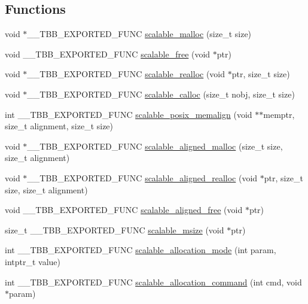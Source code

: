 \subsection*{Functions}
\begin{DoxyCompactItemize}
\item 
void $\ast$\+\_\+\+\_\+\+T\+B\+B\+\_\+\+E\+X\+P\+O\+R\+T\+E\+D\+\_\+\+F\+U\+N\+C \hyperlink{group__memory__allocation_ga2a5bdc71439a70b20f2eadf6e1a489e1}{scalable\+\_\+malloc} (size\+\_\+t size)
\item 
void \+\_\+\+\_\+\+T\+B\+B\+\_\+\+E\+X\+P\+O\+R\+T\+E\+D\+\_\+\+F\+U\+N\+C \hyperlink{group__memory__allocation_ga2ad3952b8c4dd7d293e02ae18fc37b84}{scalable\+\_\+free} (void $\ast$ptr)
\item 
void $\ast$\+\_\+\+\_\+\+T\+B\+B\+\_\+\+E\+X\+P\+O\+R\+T\+E\+D\+\_\+\+F\+U\+N\+C \hyperlink{group__memory__allocation_ga40d6e0bc19cdfa3005b2b935c62077a1}{scalable\+\_\+realloc} (void $\ast$ptr, size\+\_\+t size)
\item 
void $\ast$\+\_\+\+\_\+\+T\+B\+B\+\_\+\+E\+X\+P\+O\+R\+T\+E\+D\+\_\+\+F\+U\+N\+C \hyperlink{group__memory__allocation_ga3b4ff39555cd9e929fce2958325cd8ea}{scalable\+\_\+calloc} (size\+\_\+t nobj, size\+\_\+t size)
\item 
int \+\_\+\+\_\+\+T\+B\+B\+\_\+\+E\+X\+P\+O\+R\+T\+E\+D\+\_\+\+F\+U\+N\+C \hyperlink{group__memory__allocation_gaf117b4994f719d539804da8dd115e28c}{scalable\+\_\+posix\+\_\+memalign} (void $\ast$$\ast$memptr, size\+\_\+t alignment, size\+\_\+t size)
\item 
void $\ast$\+\_\+\+\_\+\+T\+B\+B\+\_\+\+E\+X\+P\+O\+R\+T\+E\+D\+\_\+\+F\+U\+N\+C \hyperlink{group__memory__allocation_ga903307de17bc1611515f8e6ae782a3d6}{scalable\+\_\+aligned\+\_\+malloc} (size\+\_\+t size, size\+\_\+t alignment)
\item 
void $\ast$\+\_\+\+\_\+\+T\+B\+B\+\_\+\+E\+X\+P\+O\+R\+T\+E\+D\+\_\+\+F\+U\+N\+C \hyperlink{group__memory__allocation_gaa07391c54330b2e4dd1743ae9c9c4f2d}{scalable\+\_\+aligned\+\_\+realloc} (void $\ast$ptr, size\+\_\+t size, size\+\_\+t alignment)
\item 
void \+\_\+\+\_\+\+T\+B\+B\+\_\+\+E\+X\+P\+O\+R\+T\+E\+D\+\_\+\+F\+U\+N\+C \hyperlink{group__memory__allocation_gad9aa7595581a7bc5be193d7e034c8f61}{scalable\+\_\+aligned\+\_\+free} (void $\ast$ptr)
\item 
size\+\_\+t \+\_\+\+\_\+\+T\+B\+B\+\_\+\+E\+X\+P\+O\+R\+T\+E\+D\+\_\+\+F\+U\+N\+C \hyperlink{group__memory__allocation_ga2b718206e50acb6392b86e4877d98213}{scalable\+\_\+msize} (void $\ast$ptr)
\item 
int \+\_\+\+\_\+\+T\+B\+B\+\_\+\+E\+X\+P\+O\+R\+T\+E\+D\+\_\+\+F\+U\+N\+C \hyperlink{group__memory__allocation_ga7f5029970f72ebbffee896c46a23958e}{scalable\+\_\+allocation\+\_\+mode} (int param, intptr\+\_\+t value)
\item 
int \+\_\+\+\_\+\+T\+B\+B\+\_\+\+E\+X\+P\+O\+R\+T\+E\+D\+\_\+\+F\+U\+N\+C \hyperlink{group__memory__allocation_gabe5acd876b4d89bf89787c4e779c2518}{scalable\+\_\+allocation\+\_\+command} (int cmd, void $\ast$param)
\end{DoxyCompactItemize}


